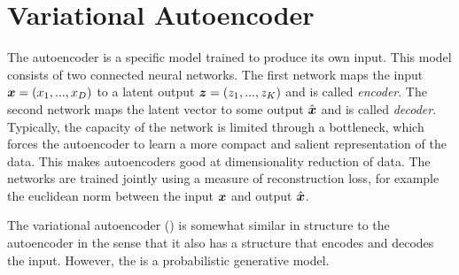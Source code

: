 \section{Variational Autoencoder}


The autoencoder is a specific model trained to produce its own input. This model consists of two connected neural networks. The first network maps the input $\boldsymbol{x} = (x_1, ..., x_D)$ to a latent output $\boldsymbol{z} = (z_1, ..., z_K)$ and is called \emph{encoder}. The second network maps the latent vector to some output $\hat{\boldsymbol{x}}$ and is called \emph{decoder}. Typically, the capacity of the network is limited through a bottleneck, which forces the autoencoder to learn a more compact and salient representation of the data. This makes autoencoders good at dimensionality reduction of data. The networks are trained jointly using a measure of reconstruction loss, for example the euclidean norm between the input $\boldsymbol{x}$ and output $\hat{\boldsymbol{x}}$.





The variational autoencoder (\vae{}) is somewhat similar in structure to the autoencoder in the sense that it also has a structure that encodes and decodes the input. However, the \vae{} is a probabilistic generative model.

